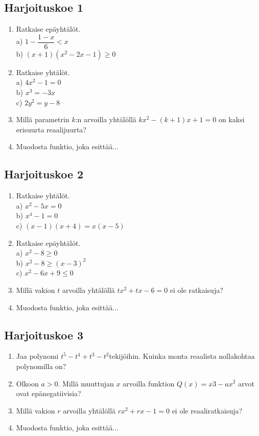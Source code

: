 \subsection*{Harjoituskoe 1}

\begin{enumerate}
\item Ratkaise epäyhtälöt.\\ a) $1-\dfrac{1-x}{6}<x$\\ b) $(x+1)(x^2-2x-1)\geq0$
\item Ratkaise yhtälöt.\\ a) $4x^2-1=0$\\ b) $x^3=-3x$\\ c) $2y^2=y-8$
\item Millä parametrin $k$:n arvoilla yhtälöllä $kx^2-(k+1)x+1=0$ on kaksi erisuurta reaalijuurta? 
\item Muodosta funktio, joka esittää...

\end{enumerate}

\subsection*{Harjoituskoe 2}

\begin{enumerate}
\item Ratkaise yhtälöt.\\ a) $x^2-5x=0$\\ b) $x^4-1=0$\\ c) $(x-1)(x+4) = x(x-5)$
\item Ratkaise epäyhtälöt.\\ a) $x^2-8\geq0$\\ b) $x^2-8\geq(x-3)^2$\\ c) $x^2-6x+9\leq0$
\item Millä vakion $t$ arvoilla yhtälöllä $tx^2+tx-6=0$ ei ole ratkaisuja?
\item Muodosta funktio, joka esittää...
\end{enumerate}


\subsection*{Harjoituskoe 3}

\begin{enumerate}
\item Jaa polynomi $t^5-t^4+t^3-t^2$tekijöihin. Kuinka monta reaalista nollakohtaa polynomilla on?
\item Olkoon $a > 0$. Millä muuttujan $x$ arvoilla funktion $Q(x)=x3−ax^2$ arvot ovat epänegatiivisia?
\item Millä vakion $r$ arvoilla yhtälöllä $rx^2+rx-1=0$ ei ole reaaliratkaisuja?
\item Muodosta funktio, joka esittää...
\end{enumerate}


